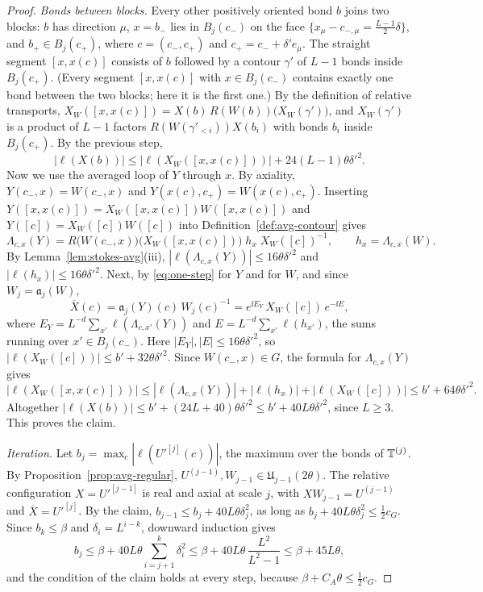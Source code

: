 \begin{proof}
\emph{Bonds between blocks.} Every other positively oriented bond $b$ joins two blocks: $b$ has direction $\mu$, $x=b_-$ lies in $B_j(c_-)$ on the face $\{x_\mu-c_{-,\mu}=\frac{L-1}2\delta\}$, and $b_+\in B_j(c_+)$, where $c=(c_-,c_+)$ and $c_+=c_-+\delta'e_\mu$. The straight segment $[x,x(c)]$ consists of $b$ followed by a contour $\gamma'$ of $L-1$ bonds inside $B_j(c_+)$. (Every segment $[x,x(c)]$ with $x\in B_j(c_-)$ contains exactly one bond between the two blocks; here it is the first one.) By the definition of relative transports, $X_W([x,x(c)])=X(b)\,R(W(b))\big(X_W(\gamma')\big)$, and $X_W(\gamma')$ is a product of $L-1$ factors $R(W(\gamma'_{<i}))X(b_i)$ with bonds $b_i$ inside $B_j(c_+)$. By the previous step,
\[
|\ell(X(b))|\le|\ell(X_W([x,x(c)]))|+24(L-1)\theta\delta'^2 .
\]
Now we use the averaged loop of $Y$ through $x$. By axiality, $Y(c_-,x)=W(c_-,x)$ and $Y(x(c),c_+)=W(x(c),c_+)$. Inserting $Y([x,x(c)])=X_W([x,x(c)])W([x,x(c)])$ and $Y([c])=X_W([c])W([c])$ into Definition~\ref{def:avg-contour} gives
\[
\Lambda_{c,x}(Y)=R\big(W(c_-,x)\big)\big(X_W([x,x(c)])\big)\;h_x\;X_W([c])^{-1},\qquad h_x=\Lambda_{c,x}(W).
\]
By Lemma~\ref{lem:stokes-avg}(iii), $|\ell(\Lambda_{c,x}(Y))|\le16\theta\delta'^2$ and $|\ell(h_x)|\le16\theta\delta'^2$. Next, by \eqref{eq:one-step} for $Y$ and for $W$, and since $W_j=\mathfrak a_j(W)$,
\[
\overline X(c)=\mathfrak a_j(Y)(c)\,W_j(c)^{-1}=e^{\ii E_Y}\,X_W([c])\,e^{-\ii E},
\]
where $E_Y=L^{-d}\sum_{x'}\ell(\Lambda_{c,x'}(Y))$ and $E=L^{-d}\sum_{x'}\ell(h_{x'})$, the sums running over $x'\in B_j(c_-)$. Here $|E_Y|,|E|\le16\theta\delta'^2$, so $|\ell(X_W([c]))|\le b'+32\theta\delta'^2$. Since $W(c_-,x)\in G$, the formula for $\Lambda_{c,x}(Y)$ gives
\[
|\ell(X_W([x,x(c)]))|\le|\ell(\Lambda_{c,x}(Y))|+|\ell(h_x)|+|\ell(X_W([c]))|\le b'+64\theta\delta'^2 .
\]
Altogether $|\ell(X(b))|\le b'+(24L+40)\theta\delta'^2\le b'+40L\theta\delta'^2$, since $L\ge3$. This proves the claim.

\emph{Iteration.} Let $b_j=\max_c|\ell(U'^{[j]}(c))|$, the maximum over the bonds of $\mathbb T^{(j)}$. By Proposition~\ref{prop:avg-regular}, $U^{(j-1)},W_{j-1}\in\mathfrak U_{j-1}(2\theta)$. The relative configuration $X=U'^{[j-1]}$ is real and axial at scale $j$, with $XW_{j-1}=U^{(j-1)}$ and $\overline X=U'^{[j]}$. By the claim, $b_{j-1}\le b_j+40L\theta\delta_j^2$, as long as $b_j+40L\theta\delta_j^2\le\frac12c_G$. Since $b_k\le\beta$ and $\delta_i=L^{i-k}$, downward induction gives
\[
b_j\le\beta+40L\theta\sum_{i=j+1}^k\delta_i^2\le\beta+40L\theta\,\frac{L^2}{L^2-1}\le\beta+45L\theta ,
\]
and the condition of the claim holds at every step, because $\beta+C_A\theta\le\frac12c_G$.
\end{proof}

